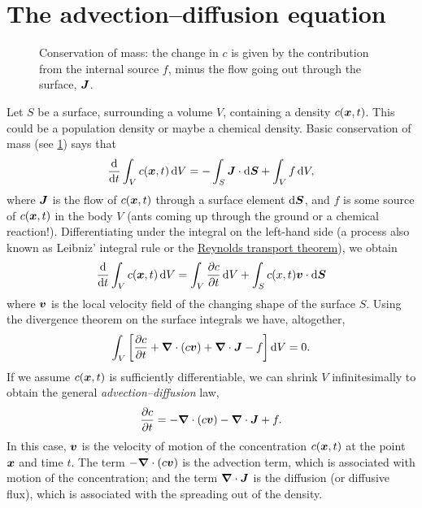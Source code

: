 \documentclass[main.tex]{subfiles}
\begin{document}
\section{The advection--diffusion equation}
\begin{figure}
\centering

\caption{Conservation of mass: the change in $c$ is given by the contribution from the internal source $f$, minus the flow going out through the surface, $\v{J}$.}
\label{fig:cons-of-mass}
\end{figure}

Let $S$ be a surface, surrounding a volume $V$, containing a density $c(\v{x},t)$. This could be a population density or maybe a chemical density. Basic conservation of mass (see \cref{fig:cons-of-mass}) says that
\begin{equation}
\fd{}{t}\int_{V}c(\v{x},t) \, \d V = -\int_{S}\v{J}\cdot \d \v{S}  + \int_{V} f \, \d V,
\end{equation}
where $\v{J}$ is the flow of $c(\v{x},t)$ through a surface element $\d\v{S}$, and $f$ is some source of $c(\v{x},t)$ in the body $V$ (ants coming up through the ground or a chemical reaction!). Differentiating under the integral on the left-hand side (a process also known as Leibniz' integral rule or the \href{https://en.wikipedia.org/wiki/Reynolds_transport_theorem}{Reynolds transport theorem}), we obtain 
\begin{equation}
\fd{}{t}\int_{V}c(\v{x},t) \, \d V  = \int_{V}\pd{c}{t}\,\d V  + \int_{S}c(x,t)\v{v}\cdot \d{\v{S}}
\end{equation}
where $\v{v}$ is the local velocity field of the changing shape of the surface $S$. Using the divergence theorem on the surface integrals we have, altogether,
\begin{equation}
\int_{V}\left[\pd{c}{t}+ \vdel\cdot (c \v{v}) + \vdel \cdot \v{J} - f \right]\d{V} =0. 
\end{equation} 
If we assume $c(\v{x},t)$ is sufficiently differentiable, we can shrink $V$ infinitesimally to obtain the general \emph{advection--diffusion} law,
\begin{equation}
\label{adv-diff-law}
\pd{c}{t} = - \vdel\cdot (c \v{v}) -  \vdel \cdot \v{J} + f.  
\end{equation}
In this case, $\v{v}$ is the velocity of motion of the concentration $c(\v{x},t)$ at the point $\v{x}$ and time $t$. The term $- \vdel\cdot (c \v{v}) $ is the advection term, which is associated with motion of the concentration;  and the term  $\vdel \cdot \v{J}$ is the diffusion (or diffusive flux), which is associated with the spreading out of the density.
\end{document}
